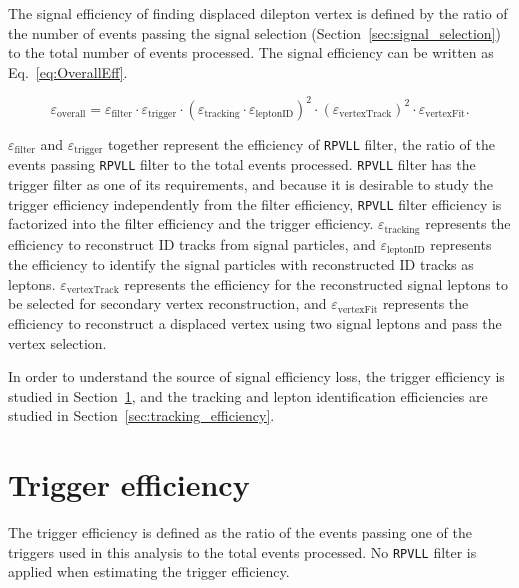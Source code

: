 The signal efficiency of finding displaced dilepton vertex is defined by the ratio of the number of events passing the signal selection (Section~\ref{sec:signal_selection}) to the total number of events processed. The signal efficiency can be written as Eq.~\ref{eq:OverallEff}. 

\begin{equation}
\label{eq:OverallEff}
\varepsilon_{\mathrm{overall}} = \varepsilon_{\mathrm{filter}} \cdot \varepsilon_{\mathrm{trigger}} \cdot 
                     (\varepsilon_{\mathrm{tracking}} \cdot \varepsilon_{\mathrm{leptonID}})^2 \cdot
                     (\varepsilon_{\mathrm{vertexTrack}})^2 \cdot
                     \varepsilon_{\mathrm{vertexFit}}.
\end{equation}

$\varepsilon_{\mathrm{filter}}$ and $\varepsilon_{\mathrm{trigger}}$ together represent the efficiency of \texttt{RPVLL} filter, the ratio of the events passing \texttt{RPVLL} filter to the total events processed. \texttt{RPVLL} filter has the trigger filter as one of its requirements, and because it is desirable to study the trigger efficiency independently from the filter efficiency, \texttt{RPVLL} filter efficiency is factorized into the filter efficiency and the trigger efficiency. $\varepsilon_{\mathrm{tracking}}$ represents the efficiency to reconstruct ID tracks from signal particles, and $\varepsilon_{\mathrm{leptonID}}$ represents the efficiency to identify the signal particles with reconstructed ID tracks as leptons. $\varepsilon_{\mathrm{vertexTrack}}$ represents the efficiency for the reconstructed signal leptons to be selected for secondary vertex reconstruction, and $\varepsilon_{\mathrm{vertexFit}}$ represents the efficiency to reconstruct a displaced vertex using two signal leptons and pass the vertex selection.

In order to understand the source of signal efficiency loss, the trigger efficiency is studied in Section~\ref{sec:trigger_efficiency}, and the tracking and lepton identification efficiencies are studied in Section~\ref{sec:tracking_efficiency}.

\section{Trigger efficiency}
\label{sec:trigger_efficiency}
The trigger efficiency is defined as the ratio of the events passing one of the triggers used in this analysis to the total events processed. No \texttt{RPVLL} filter is applied when estimating the trigger efficiency.


